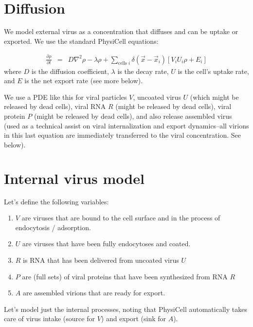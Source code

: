 \documentclass[12point]{article}
\begin{document}
\section{Diffusion}
We model external virus as a concentration that diffuses and can be uptake or exported. We use the standard PhysiCell equations: 

\begin{eqnarray}
\frac{\partial \rho }{\partial t} & = & 
D \nabla^2 \rho - \lambda \rho + 
\sum_{\textrm{cells }i} 
\delta( \vec{x} - \vec{x}_i ) \left[ 
V_i U_i \rho + E_i 
\right]
\end{eqnarray}
where $D$ is the diffusion coefficient, $\lambda$ is the decay rate, $U$ is the cell's uptake rate, and $E$ is the net export rate (see more below). 

We use a PDE like this for viral particles $V$, uncoated virus $U$ (which might be released by dead cells), viral RNA $R$ (might be released by dead cells), viral protein $P$ (might be released by dead cells), and also 
release assembled virus (used as a technical assist on viral internalization and export dynamics--all virions in this last equation are immediately transferred to the viral concentration. See below). 

\section{Internal virus model}
Let's define the following variables: 
\begin{enumerate}
\item 
$V$ are viruses that are bound to the cell surface and in the process of endocytosis / adsorption. 

\item 
$U$ are viruses that have been fully endocytoses and coated. 

\item 
$R$ is RNA that has been delivered from uncoated virus $U$

\item 
$P$ are (full sets) of viral proteins that have been synthesized from RNA $R$

\item 
$A$ are assembled virions that are ready for export. 

\end{enumerate}
Let's model just the internal processes, noting that PhysiCell automatically takes care of virus intake (source for $V$) and export (sink for $A$). 
\end{document}
